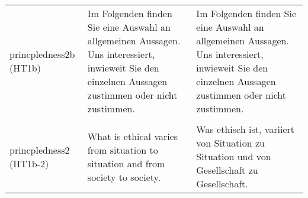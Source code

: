 \documentclass[]{article}
\begin{document}
\begin{table}[!h]
\begin{tabular}[t]{>{\raggedright\arraybackslash}p{3cm}>{\raggedright\arraybackslash}p{7cm}>{\raggedright\arraybackslash}p{7cm}}
princpledness2b (HT1b) & Im Folgenden finden Sie eine Auswahl an allgemeinen Aussagen. Uns interessiert, inwieweit Sie den einzelnen Aussagen zustimmen oder nicht zustimmen. & Im Folgenden finden Sie eine Auswahl an allgemeinen Aussagen. Uns interessiert, inwieweit Sie den einzelnen Aussagen zustimmen oder nicht zustimmen.\\
\cellcolor{gray!6}{princpledness2 (HT1b-1)} & \cellcolor{gray!6}{There are no ethical principles that are so important that everyone must follow them.} & \cellcolor{gray!6}{Es gibt keine ethischen Grundsätze, die so wichtig sind, dass jeder sie befolgen muss.}\\
princpledness2 (HT1b-2) & What is ethical varies from situation to situation and from society to society. & Was ethisch ist, variiert von Situation zu Situation und von Gesellschaft zu Gesellschaft.\\
\bottomrule
\end{tabular}
\end{table}
\end{document}
